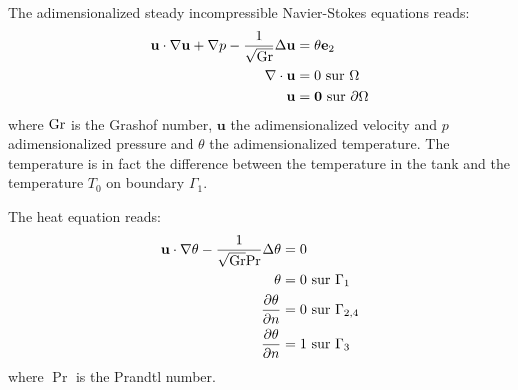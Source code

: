 The adimensionalized steady incompressible Navier-Stokes equations reads:
\begin{equation}
  \label{eq:38}
  \begin{split}
    \mathbf{u}\cdot\nabla \mathbf{u} +\nabla p -\frac{1}{\sqrt{\mathrm{Gr}}} \Delta \mathbf{u} &= \theta \mathbf{e}_2\\
    \nabla \cdot \mathbf{u} & = 0\ \text{sur}\ \Omega\\
    \mathbf{u} & = \mathbf{0}\ \text{sur}\ \partial \Omega
  \end{split}
\end{equation}
where $\mathrm{Gr}$ is the Grashof number, $\mathbf{u}$ the adimensionalized
velocity and $p$ adimensionalized pressure and $\theta$ the
adimensionalized temperature. The temperature is in fact the
difference between the temperature in the tank and the temperature
$T_0$ on boundary $\Gamma_1$.

The heat equation reads:
\begin{equation}
  \label{eq:37}
  \begin{split}
    \mathbf{u} \cdot \nabla \theta -\frac{1}{\sqrt{\Gr}\Pr} \Delta \theta &= 0\\
    \theta &= 0\ \text{sur}\ \Gamma_1\\
    \frac{\partial \theta}{\partial n} &= 0\ \text{sur}\ \Gamma_{2,4}\\
    \frac{\partial \theta}{\partial n} &= 1\ \text{sur}\ \Gamma_3
  \end{split}
\end{equation}
where $\Pr$ is the Prandtl number.



